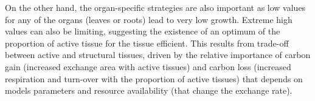 \begin{figure}%
    \classiccaptionstyle
{}
\end{figure}

On the other hand, the organ-specific strategies are also important as low values for any of the organs (leaves or roots) lead to very low growth. Extreme high values can also be limiting, suggesting the existence of an optimum of the proportion of active tissue for the tissue efficient. This  results from trade-off between active and structural tissues, driven by the relative importance of carbon gain (increased exchange area with active tissues) and carbon loss (increased respiration and turn-over with the proportion of active tissues) that depends on models parameters and resource availability (that change the exchange rate).

